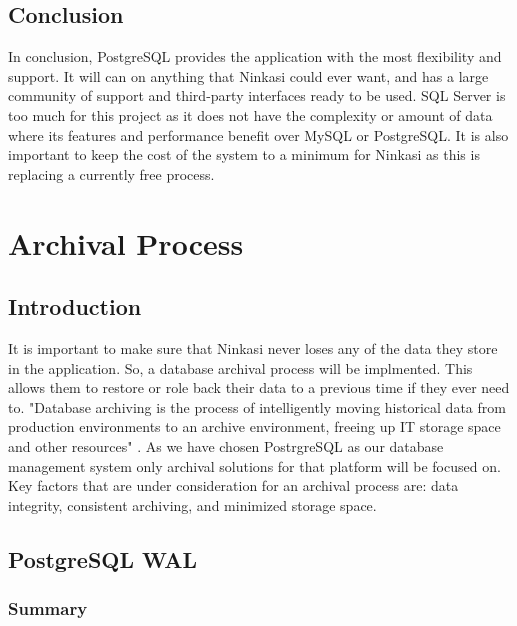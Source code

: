     \subsection{Conclusion}

    In conclusion, PostgreSQL provides the application with the most flexibility and support.  It will can on anything that Ninkasi could ever want, and has a large community of support and third-party interfaces ready to be used.  SQL Server is too much for this project as it does not have the complexity or amount of data where its features and performance benefit over MySQL or PostgreSQL.  It is also important to keep the cost of the system to a minimum for Ninkasi as this is replacing a currently free process.

\section{Archival Process}

    \subsection{Introduction}
    
    It is important to make sure that Ninkasi never loses any of the data they store in the application.  So, a database archival process will be implmented.  This allows them to restore or role back their data to a previous time if they ever need to.  "Database archiving is the process of intelligently moving historical data from production environments to an archive environment, freeing up IT storage space and other resources" \cite{ibm_archiving}.  As we have chosen PostrgreSQL as our database management system only archival solutions for that platform will be focused on.  Key factors that are under consideration for an archival process are: data integrity, consistent archiving, and minimized storage space.
    
    \subsection{PostgreSQL WAL}
    
        \subsubsection{Summary}
        

